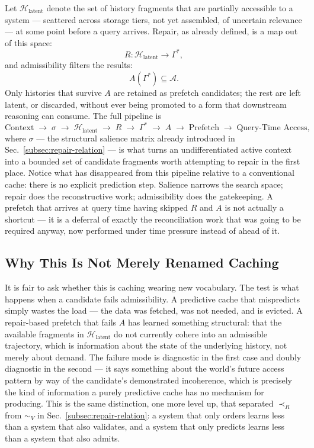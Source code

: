 \documentclass[12pt,a4paper]{article}
\theoremstyle{plain}
\theoremstyle{definition}
\theoremstyle{remark}
\begin{document}
Let $\mathcal{H}_{\mathrm{latent}}$ denote the set of history fragments that are partially accessible to a system — scattered across storage tiers, not yet assembled, of uncertain relevance — at some point before a query arrives. Repair, as already defined, is a map out of this space:
\[
R : \mathcal{H}_{\mathrm{latent}} \longrightarrow \Gamma^{*},
\]
and admissibility filters the results:
\[
A(\Gamma^{*}) \subseteq \mathcal{A}.
\]
Only histories that survive $A$ are retained as prefetch candidates; the rest are left latent, or discarded, without ever being promoted to a form that downstream reasoning can consume. The full pipeline is
\[
\text{Context} \;\to\; \sigma \;\to\; \mathcal{H}_{\mathrm{latent}} \;\to\; R \;\to\; \Gamma^{*} \;\to\; A \;\to\; \text{Prefetch} \;\to\; \text{Query-Time Access},
\]
where $\sigma$ — the structural salience matrix already introduced in Sec.~\ref{subsec:repair-relation} — is what turns an undifferentiated active context into a bounded set of candidate fragments worth attempting to repair in the first place. Notice what has disappeared from this pipeline relative to a conventional cache: there is no explicit prediction step. Salience narrows the search space; repair does the reconstructive work; admissibility does the gatekeeping. A prefetch that arrives at query time having skipped $R$ and $A$ is not actually a shortcut — it is a deferral of exactly the reconciliation work that was going to be required anyway, now performed under time pressure instead of ahead of it.

\subsection{Why This Is Not Merely Renamed Caching}
\label{subsec:not-caching}

It is fair to ask whether this is caching wearing new vocabulary. The test is what happens when a candidate fails admissibility. A predictive cache that mispredicts simply wastes the load — the data was fetched, was not needed, and is evicted. A repair-based prefetch that fails $A$ has learned something structural: that the available fragments in $\mathcal{H}_{\mathrm{latent}}$ do not currently cohere into an admissible trajectory, which is information about the state of the underlying history, not merely about demand. The failure mode is diagnostic in the first case and doubly diagnostic in the second — it says something about the world's future access pattern by way of the candidate's demonstrated incoherence, which is precisely the kind of information a purely predictive cache has no mechanism for producing. This is the same distinction, one more level up, that separated $\prec_R$ from $\sim_V$ in Sec.~\ref{subsec:repair-relation}: a system that only orders learns less than a system that also validates, and a system that only predicts learns less than a system that also admits.
\end{document}
